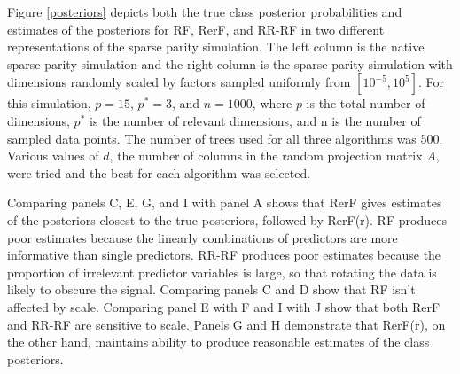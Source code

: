 Figure \ref{posteriors} depicts both the true class posterior probabilities and estimates of the posteriors for RF, RerF, and RR-RF in two different representations of the sparse parity simulation. The left column is the native sparse parity simulation and the right column is the sparse parity simulation with dimensions randomly scaled by factors sampled uniformly from $[10^{-5},10^5]$. For this simulation, $p = 15$, $p^* = 3$, and $n = 1000$, where $p$ is the total number of dimensions, $p^*$ is the number of relevant dimensions, and n is the number of sampled data points. The number of trees used for all three algorithms was 500. Various values of $d$, the number of columns in the random projection matrix $A$, were tried and the best for each algorithm was selected. 

Comparing panels C, E, G, and I with panel A shows that RerF gives estimates of the posteriors closest to the true posteriors, followed by RerF(r). RF produces poor estimates because the linearly combinations of predictors are more informative than single predictors. RR-RF produces poor estimates because the proportion of irrelevant predictor variables is large, so that rotating the data is likely to obscure the signal. Comparing panels C and D show that RF isn't affected by scale. Comparing panel E with F and I with J show that both RerF and RR-RF are sensitive to scale. Panels G and H demonstrate that RerF(r), on the other hand, maintains ability to produce reasonable estimates of the class posteriors.

